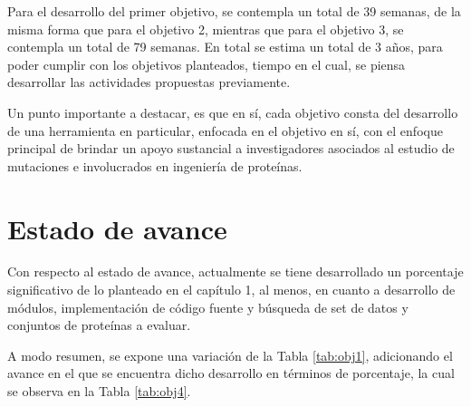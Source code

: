 Para el desarrollo del primer objetivo, se contempla un total de 39 semanas, de la misma forma que para el objetivo 2, mientras que para el objetivo 3, se contempla un total de 79 semanas. En total se estima un total de 3 años, para poder cumplir con los objetivos planteados, tiempo en el cual, se piensa desarrollar las actividades propuestas previamente. 

Un punto importante a destacar, es que en sí, cada objetivo consta del desarrollo de una herramienta en particular, enfocada en el objetivo en sí, con el enfoque principal de brindar un apoyo sustancial a investigadores asociados al estudio de mutaciones e involucrados en ingeniería de proteínas.

\section{Estado de avance}

Con respecto al estado de avance, actualmente se tiene desarrollado un porcentaje significativo de lo planteado en el capítulo 1, al menos, en cuanto a desarrollo de módulos, implementación de código fuente y búsqueda de set de datos y conjuntos de proteínas a evaluar.

A modo resumen, se expone una variación de la Tabla \ref{tab:obj1}, adicionando el avance en el que se encuentra dicho desarrollo en términos de porcentaje, la cual se observa en la Tabla \ref{tab:obj4}.


